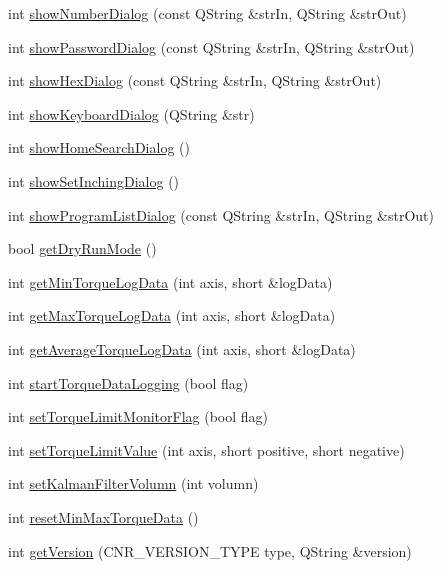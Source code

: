 \begin{DoxyCompactItemize}
\item 
int \hyperlink{classCUIApp_a9d18970cff5ce1265a65098c5a866dcb}{show\-Number\-Dialog} (const Q\-String \&str\-In, Q\-String \&str\-Out)
\item 
int \hyperlink{classCUIApp_a8cec29d70ac25427f29b774ba441202c}{show\-Password\-Dialog} (const Q\-String \&str\-In, Q\-String \&str\-Out)
\item 
int \hyperlink{classCUIApp_a8601870e0a38673fb01b2c4434370f5b}{show\-Hex\-Dialog} (const Q\-String \&str\-In, Q\-String \&str\-Out)
\item 
int \hyperlink{classCUIApp_a88513c30feec1d4fe8066371ca112d71}{show\-Keyboard\-Dialog} (Q\-String \&str)
\item 
int \hyperlink{classCUIApp_ae2633f43e94dfb880ff1277699226519}{show\-Home\-Search\-Dialog} ()
\item 
int \hyperlink{classCUIApp_aaa47294e1b6c6c671c5c0bdd94091a83}{show\-Set\-Inching\-Dialog} ()
\item 
int \hyperlink{classCUIApp_a13a1b4f0cc4b06e300cec033532735b7}{show\-Program\-List\-Dialog} (const Q\-String \&str\-In, Q\-String \&str\-Out)
\item 
bool \hyperlink{classCUIApp_af86f04f24e5529f99e952d69b9a9c787}{get\-Dry\-Run\-Mode} ()
\item 
int \hyperlink{classCUIApp_aa3d417803b6914e8b5b9d7ddb58d4efd}{get\-Min\-Torque\-Log\-Data} (int axis, short \&log\-Data)
\item 
int \hyperlink{classCUIApp_a43b0348d921203b6d15874b3f56a8298}{get\-Max\-Torque\-Log\-Data} (int axis, short \&log\-Data)
\item 
int \hyperlink{classCUIApp_a5c062b76fb34f6585138cecfddecaebf}{get\-Average\-Torque\-Log\-Data} (int axis, short \&log\-Data)
\item 
int \hyperlink{classCUIApp_a13fb4cbbb6da8eaddd3559291346a17d}{start\-Torque\-Data\-Logging} (bool flag)
\item 
int \hyperlink{classCUIApp_a316cae00cda86a676ec0dc350b0f985e}{set\-Torque\-Limit\-Monitor\-Flag} (bool flag)
\item 
int \hyperlink{classCUIApp_a2817d696dbe549b3e5024b5710c36aaa}{set\-Torque\-Limit\-Value} (int axis, short positive, short negative)
\item 
int \hyperlink{classCUIApp_afec821ab1d2fbe6c56f3824e9eca0452}{set\-Kalman\-Filter\-Volumn} (int volumn)
\item 
int \hyperlink{classCUIApp_a4c947f133769866ed8f83ca0fb26b8bf}{reset\-Min\-Max\-Torque\-Data} ()
\item 
int \hyperlink{classCUIApp_a50b55afe3b66bc00cb1e2e34ed8db2b0}{get\-Version} (C\-N\-R\-\_\-\-V\-E\-R\-S\-I\-O\-N\-\_\-\-T\-Y\-P\-E type, Q\-String \&version)
\end{DoxyCompactItemize}
